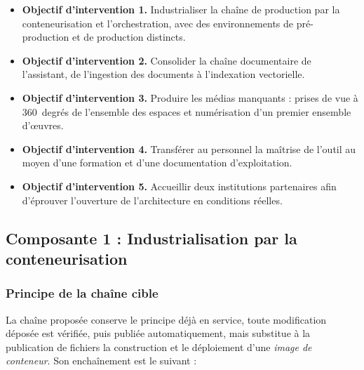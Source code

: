 \begin{itemize}[label={},leftmargin=0pt,itemsep=5pt,topsep=4pt,parsep=0pt]
  \item \textbf{Objectif d'intervention 1.} Industrialiser la chaîne de production par la
        conteneurisation et l'orchestration, avec des environnements de
        pré-production et de production distincts.
  \item \textbf{Objectif d'intervention 2.} Consolider la chaîne documentaire de l'assistant, de
        l'ingestion des documents à l'indexation vectorielle.
  \item \textbf{Objectif d'intervention 3.} Produire les médias manquants : prises de vue à
        360~degrés de l'ensemble des espaces et numérisation d'un premier
        ensemble d'œuvres.
  \item \textbf{Objectif d'intervention 4.} Transférer au personnel la maîtrise de l'outil au moyen
        d'une formation et d'une documentation d'exploitation.
  \item \textbf{Objectif d'intervention 5.} Accueillir deux institutions partenaires afin d'éprouver
        l'ouverture de l'architecture en conditions réelles.
\end{itemize}

\subsection{Composante 1 : Industrialisation par la conteneurisation}

\subsubsection{Principe de la chaîne cible}

La chaîne proposée conserve le principe déjà en service, toute modification
déposée est vérifiée, puis publiée automatiquement, mais substitue à la
publication de fichiers la construction et le déploiement d'une \emph{image de
conteneur}. Son enchaînement est le suivant :

